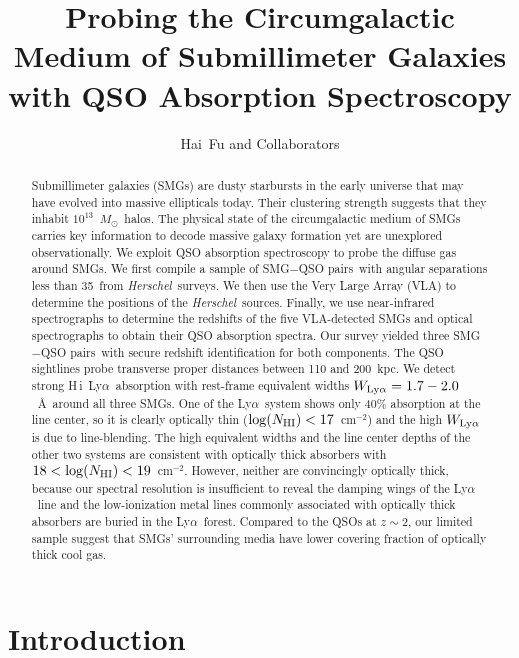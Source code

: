 \documentclass[iop,revtex4,twocolumn,apj,numberedappendix,appendixfloats]{emulateapj}
\newcommand{\hers}{{\it Herschel}}
\newcommand{\cmsq}{{cm$^{-2}$}}
\newcommand{\msun}{$M_{\odot}$}
\newcommand{\lya}{Ly$\alpha$}
\newcommand{\HI}{H\,{\sc i}}
\newcommand{\sqps}{SMG$-$QSO pairs}
\begin{document}
\title{Probing the Circumgalactic Medium of Submillimeter Galaxies with QSO Absorption Spectroscopy}

%
\author{
Hai~Fu and Collaborators
}

\begin{abstract}
Submillimeter galaxies (SMGs) are dusty starbursts in the early universe that may have evolved into massive ellipticals today. Their clustering strength suggests that they inhabit $10^{13}$~\msun\ halos. The physical state of the circumgalactic medium of SMGs carries key information to decode massive galaxy formation yet are unexplored observationally. We exploit QSO absorption spectroscopy to probe the diffuse gas around SMGs.
% 
We first compile a sample of \sqps\ with angular separations less than 35\arcsec\ from \hers\ surveys. We then use the Very Large Array (VLA) to determine the positions of the \hers\ sources. Finally, we use near-infrared spectrographs to determine the redshifts of the five VLA-detected SMGs and optical spectrographs to obtain their QSO absorption spectra. 
%
Our survey yielded three \sqps\ with secure redshift identification for both components. The QSO sightlines probe transverse proper distances between 110 and 200~kpc. We detect strong \HI\ \lya\ absorption with rest-frame equivalent widths $W_{\rm Ly\alpha} = 1.7-2.0$~\AA\ around all three SMGs. One of the \lya\ system shows only 40\% absorption at the line center, so it is clearly optically thin (${\rm log}(N_{\rm HI}) < 17$~\cmsq) and the high $W_{\rm Ly\alpha}$ is due to line-blending. The high equivalent widths and the line center depths of the other two systems are consistent with optically thick absorbers with $18 < {\rm log}(N_{\rm HI}) < 19$~\cmsq. However, neither are convincingly optically thick, because our spectral resolution is insufficient to reveal the damping wings of the \lya\ line and the low-ionization metal lines commonly associated with optically thick absorbers are buried in the \lya\ forest. Compared to the QSOs at $z \sim 2$, our limited sample suggest that SMGs' surrounding media have lower covering fraction of optically thick cool gas. 
\end{abstract}


\section{Introduction} \label{sec:intro}
\end{document}
